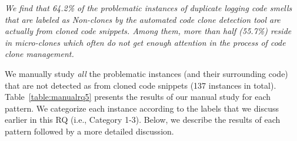 {\em We find that 64.2\% of the problematic instances of duplicate logging code smells 
that are labeled as Non-clones by the automated code clone detection tool are actually from cloned code snippets.
Among them, more than half (55.7\%) reside in micro-clones which often do not get enough attention in the process of code clone management.}

We manually study {\em all} the problematic instances (and their surrounding code) that are not detected as from cloned code snippets (137 instances in total). Table~\ref{table:manualrq5} presents the results of our manual study for each pattern. We categorize each instance according to the labels that we discuss earlier in this RQ (i.e., Category 1-3). Below, we describe the results of each pattern followed by a more detailed discussion.

